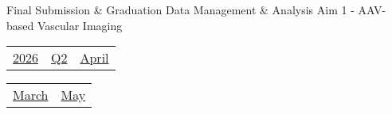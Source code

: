 \vfill{\centering{} \small{Final Submission \& Graduation}\hspace{1.5em} \small{Data Management \& Analysis}\hspace{1.5em} \small{Aim 1 - AAV-based Vascular Imaging}\hspace{1.5em}\par}

\pagebreak
{\noindent\Large\renewcommand{\arraystretch}{\myNumArrayStretch}\begin{tabular}{|l|l|l}
\hyperlink{2026}{2026} & \hyperlink{Q2}{Q2} & \hyperlink{April}{April}
\end{tabular}\hfill%
\begin{tabular}{r|r@{}}
\hyperlink{month-2026-3}{March} & \hyperlink{month-2026-5}{May}
\end{tabular}}
\myLineThick
